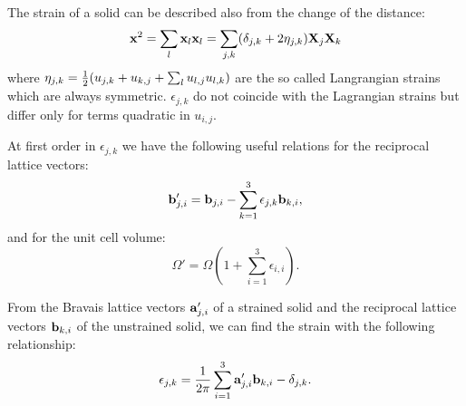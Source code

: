 \documentclass[12pt,a4paper,twoside]{report}
\begin{document}
The strain of a solid can be described also from the change of the
distance:
\begin{equation}
{\bf x}^2=\sum_l {\bf x}_l {\bf x}_l = \sum_{j,k}(\delta_{j,k} +
2 \eta_{j,k}) {\bf X}_j {\bf X}_k 
\end{equation}
where $\eta_{j,k}={1\over 2} ( u_{j,k} + u_{k,j} + \sum_l u_{l,j}u_{l,k})$ 
are the so called Langrangian strains which are always symmetric.
$\epsilon_{j,k}$ do not coincide with the Lagrangian strains but
differ only for terms quadratic in $u_{i,j}$. 

At first order in $\epsilon_{j,k}$ we have
the following useful relations for the reciprocal lattice vectors:
\begin{equation}
{\bf b}'_{j,i} = {\bf b}_{j,i} -  \sum_{k=1}^3 \epsilon_{j,k} {\bf b}_{k,i},
\end{equation}
and for the unit cell volume:
\begin{equation}
\Omega'=\Omega \left( 1+\sum_{i=1}^3 \epsilon_{i,i} \right).
\end{equation}

From the Bravais lattice vectors ${\bf a}'_{j,i}$ of a strained solid and 
the reciprocal lattice vectors ${\bf b}_{k,i}$ of the unstrained solid, 
we can find the strain with the following relationship:
\begin{equation}
\epsilon_{j,k} = {1\over 2 \pi} \sum_{i=1}^3 {\bf a}'_{j,i} {\bf b}_{k,i}
                - \delta_{j,k}.
\end{equation}
\end{document}
